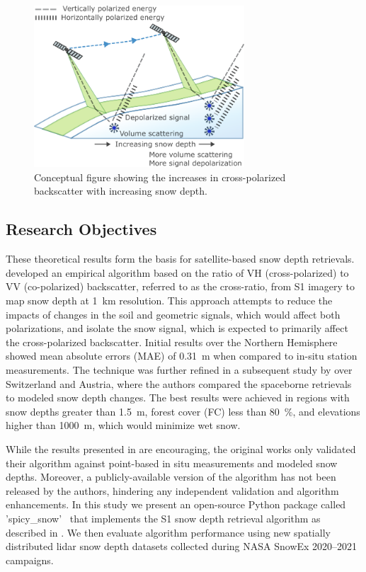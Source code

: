 \documentclass[journal abbreviation, manuscript]{copernicus}
\begin{document}
\begin{figure}[htbp]
\includegraphics[width=0.7\textwidth]{figures/fig01.png}
\caption{Conceptual figure showing the increases in cross-polarized backscatter with increasing snow depth.}
\label{fig:conceptual}
\end{figure}


\subsection{Research Objectives}

These theoretical results form the basis for satellite-based snow depth retrievals. \citet{Lievens.2019} developed an empirical algorithm based on the ratio of VH (cross-polarized) to VV (co-polarized) backscatter, referred to as the cross-ratio, from S1 imagery to map snow depth at 1~km resolution. This approach attempts to reduce the impacts of changes in the soil and geometric signals, which would affect both polarizations, and isolate the snow signal, which is expected to primarily affect the cross-polarized backscatter. Initial results over the Northern Hemisphere showed mean absolute errors (MAE) of 0.31~m when compared to in-situ station measurements. The technique was further refined in a subsequent study by \citet{Lievens.2022} over Switzerland and Austria, where the authors compared the spaceborne retrievals to modeled snow depth changes. The best results were achieved in regions with snow depths greater than 1.5~m, forest cover (FC) less than 80~\%, and elevations higher than 1000~m, which would minimize wet snow. 

While the results presented in \citet{Lievens.2019, Lievens.2022} are encouraging, the original works only validated their algorithm against point-based in situ measurements and modeled snow depths. Moreover, a publicly-available version of the algorithm has not been released by the authors, hindering any independent validation and algorithm enhancements. In this study we present an open-source Python package called 'spicy\_snow'~\citep{Hoppinen.2023} that implements the S1 snow depth retrieval algorithm as described in \citet{Lievens.2022}. We then evaluate algorithm performance using new spatially distributed lidar snow depth datasets collected during NASA SnowEx 2020--2021 campaigns.
\end{document}
